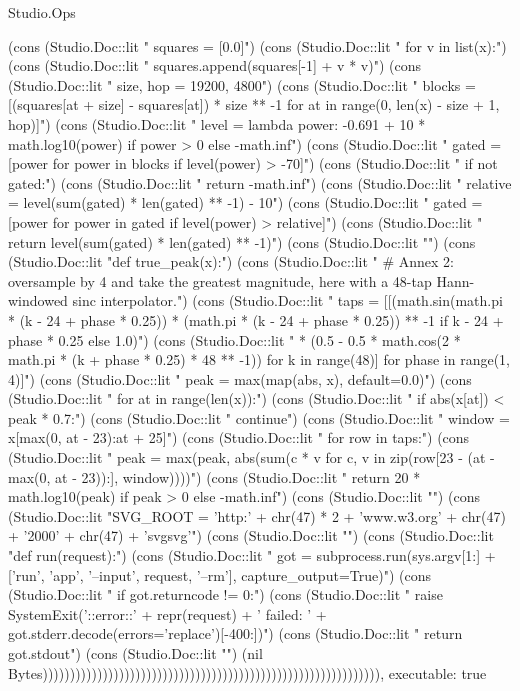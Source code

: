 \begin{lexlean}{Studio.Ops}
\begin{semanticmodule}
{{    (cons (Studio.Doc::lit "    squares = [0.0]\n")
    (cons (Studio.Doc::lit "    for v in list(x):\n")
    (cons (Studio.Doc::lit "        squares.append(squares[-1] + v * v)\n")
    (cons (Studio.Doc::lit "    size, hop = 19200, 4800\n")
    (cons (Studio.Doc::lit "    blocks = [(squares[at + size] - squares[at]) * size ** -1 for at in range(0, len(x) - size + 1, hop)]\n")
    (cons (Studio.Doc::lit "    level = lambda power: -0.691 + 10 * math.log10(power) if power > 0 else -math.inf\n")
    (cons (Studio.Doc::lit "    gated = [power for power in blocks if level(power) > -70]\n")
    (cons (Studio.Doc::lit "    if not gated:\n")
    (cons (Studio.Doc::lit "        return -math.inf\n")
    (cons (Studio.Doc::lit "    relative = level(sum(gated) * len(gated) ** -1) - 10\n")
    (cons (Studio.Doc::lit "    gated = [power for power in gated if level(power) > relative]\n")
    (cons (Studio.Doc::lit "    return level(sum(gated) * len(gated) ** -1)\n")
    (cons (Studio.Doc::lit "\n")
    (cons (Studio.Doc::lit "def true_peak(x):\n")
    (cons (Studio.Doc::lit "    # Annex 2: oversample by 4 and take the greatest magnitude, here with a 48-tap Hann-windowed sinc interpolator.\n")
    (cons (Studio.Doc::lit "    taps = [[(math.sin(math.pi * (k - 24 + phase * 0.25)) * (math.pi * (k - 24 + phase * 0.25)) ** -1 if k - 24 + phase * 0.25 else 1.0)\n")
    (cons (Studio.Doc::lit "             * (0.5 - 0.5 * math.cos(2 * math.pi * (k + phase * 0.25) * 48 ** -1)) for k in range(48)] for phase in range(1, 4)]\n")
    (cons (Studio.Doc::lit "    peak = max(map(abs, x), default=0.0)\n")
    (cons (Studio.Doc::lit "    for at in range(len(x)):\n")
    (cons (Studio.Doc::lit "        if abs(x[at]) < peak * 0.7:\n")
    (cons (Studio.Doc::lit "            continue\n")
    (cons (Studio.Doc::lit "        window = x[max(0, at - 23):at + 25]\n")
    (cons (Studio.Doc::lit "        for row in taps:\n")
    (cons (Studio.Doc::lit "            peak = max(peak, abs(sum(c * v for c, v in zip(row[23 - (at - max(0, at - 23)):], window))))\n")
    (cons (Studio.Doc::lit "    return 20 * math.log10(peak) if peak > 0 else -math.inf\n")
    (cons (Studio.Doc::lit "\n")
    (cons (Studio.Doc::lit "SVG_ROOT = '{http:' + chr(47) * 2 + 'www.w3.org' + chr(47) + '2000' + chr(47) + 'svg}svg'\n")
    (cons (Studio.Doc::lit "\n")
    (cons (Studio.Doc::lit "def run(request):\n")
    (cons (Studio.Doc::lit "    got = subprocess.run(sys.argv[1:] + ['run', 'app', '--input', request, '--rm'], capture_output=True)\n")
    (cons (Studio.Doc::lit "    if got.returncode != 0:\n")
    (cons (Studio.Doc::lit "        raise SystemExit('::error::' + repr(request) + ' failed: ' + got.stderr.decode(errors='replace')[-400:])\n")
    (cons (Studio.Doc::lit "    return got.stdout\n")
    (cons (Studio.Doc::lit "\n")
    (nil Bytes)))))))))))))))))))))))))))))))))))))))))))))))))))))))))))))),
  executable: true
}

}
\end{semanticmodule}
\end{lexlean}
